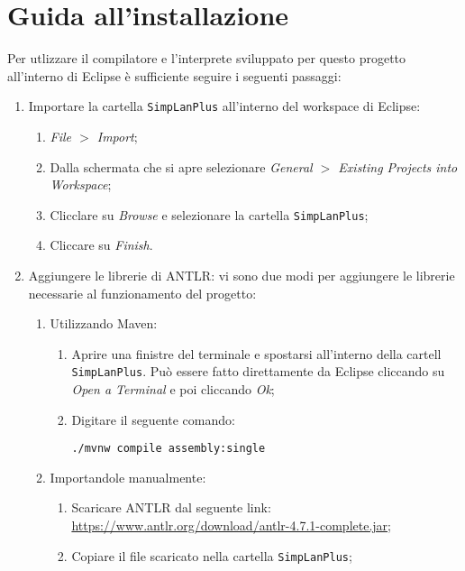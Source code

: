 \chapter{Guida all'installazione}\label{a:intstallazione}
Per utlizzare il compilatore e l'interprete sviluppato per questo progetto all'interno di Eclipse \`e sufficiente seguire i seguenti passaggi:
\begin{enumerate}
    \item Importare la cartella \verb|SimpLanPlus| all'interno del workspace di Eclipse:
        \begin{enumerate}
            \item \textit{File $>$ Import};
            \item Dalla schermata che si apre selezionare \textit{General $>$ Existing Projects into Workspace};
            \item Clicclare su \textit{Browse} e selezionare la cartella \verb|SimpLanPlus|;
            \item Cliccare su \textit{Finish}.
        \end{enumerate}
    \item Aggiungere le librerie di ANTLR: vi sono due modi per aggiungere le librerie necessarie al funzionamento del progetto:
        \begin{enumerate}
            \item Utilizzando Maven:
                \begin{enumerate}
                    \item Aprire una finistre del terminale e spostarsi all'interno della cartell \verb|SimpLanPlus|. Pu\`o essere fatto direttamente da Eclipse cliccando su \textit{Open a Terminal} e poi cliccando \textit{Ok};
                    \item Digitare il seguente comando:
                        \begin{lstlisting}
./mvnw compile assembly:single
                        \end{lstlisting}
                \end{enumerate}
            \item Importandole manualmente:
                \begin{enumerate}
                    \item Scaricare ANTLR dal seguente link: \url{https://www.antlr.org/download/antlr-4.7.1-complete.jar};
                    \item Copiare il file scaricato nella cartella \verb|SimpLanPlus|;

\end{enumerate}
\end{enumerate}
\end{enumerate}
